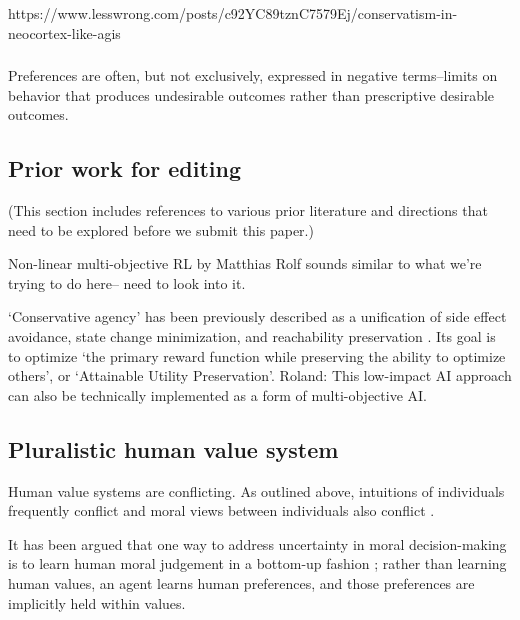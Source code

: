 https://www.lesswrong.com/posts/c92YC89tznC7579Ej/conservatism-in-neocortex-like-agis


\subsubsection{}
Preferences are often, but not exclusively, expressed in negative terms--limits on behavior that produces undesirable outcomes rather than prescriptive desirable outcomes. 

\subsection{Prior work for editing}

(This section includes references to various prior literature and directions that need to be explored before we submit this paper.)

Non-linear multi-objective RL by Matthias Rolf\cite{rolf_need_2020} sounds similar to what we're trying to do here-- need to look into it.

`Conservative agency' has been previously described as a unification of side effect avoidance, state change minimization, and reachability preservation \cite{armstrong_low_2017, turner_conservative_2020}. Its goal is to optimize `the primary reward function while preserving the ability to optimize others', or `Attainable Utility Preservation'.
Roland: This low-impact AI approach can also be technically implemented as a form of multi-objective AI.





\subsection{Pluralistic human value system}

Human value systems are conflicting. As outlined above, intuitions of individuals frequently conflict \cite{haidt2001emotional} and moral views between individuals also conflict \cite{bogosian_implementation_2017}. 

It has been argued that one way to address uncertainty in moral decision-making is to learn human moral judgement in a bottom-up fashion \cite{bogosian_implementation_2017}; rather than learning human values, an agent learns human preferences, and those preferences are implicitly held within values. 

